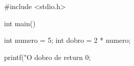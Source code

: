    
\begin{clang}
#include <stdio.h>

int main() {
    int numero = 5;
    int dobro = 2 * numero;
    
    printf("O dobro de %
    return 0;
}
\end{clang}

